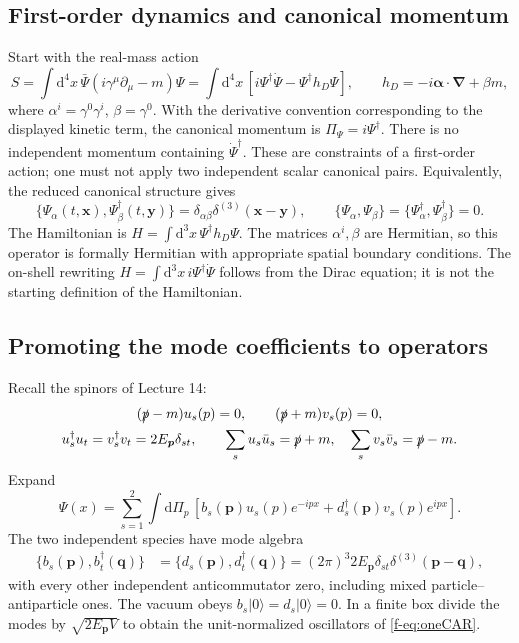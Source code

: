 \documentclass[11pt]{article}
\newcommand{\dd}{\mathrm{d}}
\newcommand{\vac}{\lvert0\rangle}
\begin{document}
\subsection{First-order dynamics and canonical momentum}
Start with the real-mass action
\begin{equation}
 S=\int\dd^4x\,\bar\Psi(i\gamma^\mu\partial_\mu-m)\Psi
   =\int\dd^4x\,[i\Psi^\dagger\dot\Psi-\Psi^\dagger h_D\Psi],
 \qquad h_D=-i\bm\alpha\cdot\bm\nabla+\beta m,
 \label{f-eq:action}
\end{equation}
where \(\alpha^i=\gamma^0\gamma^i\), \(\beta=\gamma^0\).
With the derivative convention corresponding to the displayed kinetic
term, the canonical momentum is \(\Pi_\Psi=i\Psi^\dagger\).
There is no independent momentum containing \(\dot\Psi^\dagger\).
These are constraints of a first-order action; one must not apply two
independent scalar canonical pairs. Equivalently, the reduced canonical
structure gives
\begin{equation}
 \{\Psi_\alpha(t,\bm x),\Psi_\beta^\dagger(t,\bm y)\}
 =\delta_{\alpha\beta}\delta^{(3)}(\bm x-\bm y),\qquad
 \{\Psi_\alpha,\Psi_\beta\}=\{\Psi_\alpha^\dagger,\Psi_\beta^\dagger\}=0.
 \label{f-eq:fieldCAR}
\end{equation}
The Hamiltonian is \(H=\int\dd^3x\,\Psi^\dagger h_D\Psi\).
The matrices \(\alpha^i,\beta\) are Hermitian, so this operator is formally
Hermitian with appropriate spatial boundary conditions.
The on-shell rewriting \(H=\int\dd^3x\,i\Psi^\dagger\dot\Psi\) follows from
the Dirac equation; it is not the starting definition of the Hamiltonian.

\subsection{Promoting the mode coefficients to operators}
Recall the spinors of Lecture 14:
\begin{gather}
 (\slashed p-m)u_s(p)=0,\qquad(\slashed p+m)v_s(p)=0,\notag\\
 u_s^\dagger u_t=v_s^\dagger v_t=2E_{\bm p}\delta_{st},\qquad
 \sum_su_s\bar u_s=\slashed p+m,\quad
 \sum_sv_s\bar v_s=\slashed p-m.
 \label{f-eq:spinorinput}
\end{gather}
Expand
\begin{equation}
 \Psi(x)=\sum_{s=1}^2\int\dd\Pi_p\,
 [b_s(\bm p)u_s(p)e^{-ipx}+d_s^\dagger(\bm p)v_s(p)e^{ipx}].
 \label{f-eq:modes}
\end{equation}
The two independent species have mode algebra
\begin{align}
 \{b_s(\bm p),b_t^\dagger(\bm q)\}
 &=\{d_s(\bm p),d_t^\dagger(\bm q)\}
  =(2\pi)^3 2E_{\bm p}\delta_{st}\delta^{(3)}(\bm p-\bm q),
 \label{f-eq:modeCAR}
\end{align}
with every other independent anticommutator zero, including mixed
particle--antiparticle ones. The vacuum obeys \(b_s\vac=d_s\vac=0\).
In a finite box divide the modes by \(\sqrt{2E_{\bm p}V}\) to obtain the
unit-normalized oscillators of \eqref{f-eq:oneCAR}.
\end{document}

